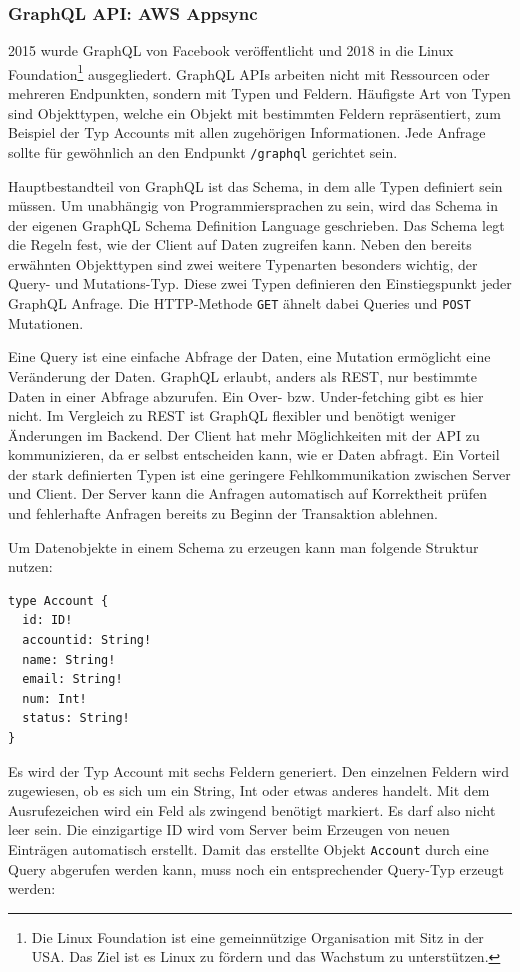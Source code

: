 \subsubsection{GraphQL API: AWS Appsync}

2015 wurde GraphQL von Facebook veröffentlicht und 2018 in die Linux Foundation\footnote{Die Linux Foundation ist eine gemeinnützige Organisation mit Sitz in der USA.
Das Ziel ist es Linux zu fördern und das Wachstum zu unterstützen.} ausgegliedert.
GraphQL APIs arbeiten nicht mit Ressourcen oder mehreren Endpunkten, sondern mit Typen und Feldern.
Häufigste Art von Typen sind Objekttypen, welche ein Objekt mit bestimmten Feldern repräsentiert, zum Beispiel der Typ Accounts mit allen zugehörigen Informationen.
Jede Anfrage sollte für gewöhnlich an den Endpunkt \verb+/graphql+ gerichtet sein.

Hauptbestandteil von GraphQL ist das Schema, in dem alle Typen definiert sein müssen.
Um unabhängig von Programmiersprachen zu sein, wird das Schema in der eigenen GraphQL Schema Definition Language geschrieben.
Das Schema legt die Regeln fest, wie der Client auf Daten zugreifen kann.
Neben den bereits erwähnten Objekttypen sind zwei weitere Typenarten besonders wichtig, der Query- und Mutations-Typ.
Diese zwei Typen definieren den Einstiegspunkt jeder GraphQL Anfrage.
Die HTTP-Methode \verb+GET+ ähnelt dabei Queries und \verb+POST+ Mutationen. \cite[]{GraphQL1}

Eine Query ist eine einfache Abfrage der Daten, eine Mutation ermöglicht eine Veränderung der Daten.
GraphQL erlaubt, anders als REST, nur bestimmte Daten in einer Abfrage abzurufen. Ein Over- bzw. Under-fetching gibt es hier nicht.
Im Vergleich zu REST ist GraphQL flexibler und benötigt weniger Änderungen im Backend.
Der Client hat mehr Möglichkeiten mit der API zu kommunizieren, da er selbst entscheiden kann, wie er Daten abfragt.
Ein Vorteil der stark definierten Typen ist eine geringere Fehlkommunikation zwischen Server und Client.
Der Server kann die Anfragen automatisch auf Korrektheit prüfen und fehlerhafte Anfragen bereits zu Beginn der Transaktion ablehnen.

Um Datenobjekte in einem Schema zu erzeugen kann man folgende Struktur nutzen:
\begin{verbatim}
type Account {
  id: ID!
  accountid: String!
  name: String!
  email: String!
  num: Int!
  status: String!
}
\end{verbatim}

Es wird der Typ Account mit sechs Feldern generiert.
Den einzelnen Feldern wird zugewiesen, ob es sich um ein String, Int oder etwas anderes handelt.
Mit dem Ausrufezeichen wird ein Feld als zwingend benötigt markiert.
Es darf also nicht leer sein. Die einzigartige ID wird vom Server beim Erzeugen von neuen Einträgen automatisch erstellt.
Damit das erstellte Objekt \verb+Account+ durch eine Query abgerufen werden kann, muss noch ein entsprechender Query-Typ erzeugt werden:

